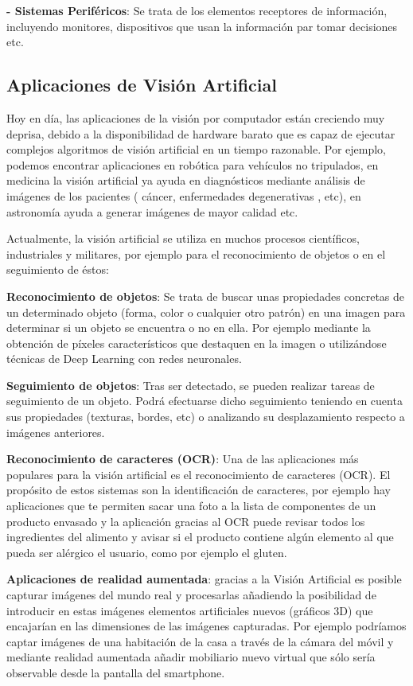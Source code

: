 	\textbf{- Sistemas Periféricos}: Se trata de los elementos receptores de información, incluyendo monitores, dispositivos que usan la información par tomar decisiones etc.

\subsection{Aplicaciones de Visión Artificial}
Hoy en día, las aplicaciones de la visión por computador están creciendo muy deprisa, debido a la disponibilidad de hardware barato que es capaz de ejecutar complejos algoritmos de visión artificial en un tiempo razonable. Por ejemplo, podemos encontrar aplicaciones en robótica para vehículos no tripulados, en medicina la visión artificial ya ayuda en diagnósticos mediante análisis de imágenes de los pacientes ( cáncer, enfermedades degenerativas , etc), en astronomía ayuda a generar imágenes de mayor calidad etc.

Actualmente, la visión artificial se utiliza en muchos procesos científicos, industriales y militares, por ejemplo para el reconocimiento de objetos o en el seguimiento de éstos:

	\textbf{Reconocimiento de objetos}: Se trata de buscar unas propiedades concretas de un determinado objeto (forma, color o cualquier otro patrón) en una imagen para determinar si un objeto se encuentra o no en ella. Por ejemplo mediante la obtención de píxeles característicos que destaquen en la imagen o utilizándose técnicas de Deep Learning con redes neuronales.

	\textbf{Seguimiento de objetos}: Tras ser detectado, se pueden realizar tareas de seguimiento de un objeto. Podrá efectuarse dicho seguimiento teniendo en cuenta sus propiedades (texturas, bordes, etc) o analizando su desplazamiento respecto a imágenes anteriores.

	\textbf{Reconocimiento de caracteres (OCR)}:  Una de las aplicaciones más populares para la visión artificial es el reconocimiento de caracteres (OCR). El propósito de estos sistemas son la identificación de caracteres, por ejemplo hay aplicaciones que te permiten sacar una foto a la lista de componentes de un producto envasado y la aplicación gracias al OCR puede revisar todos los ingredientes del alimento y avisar si el producto contiene algún elemento al que pueda ser alérgico el usuario, como por ejemplo el gluten.

	\textbf{Aplicaciones de realidad aumentada}: gracias a la Visión Artificial es posible capturar imágenes del mundo real y procesarlas añadiendo la posibilidad de introducir en estas imágenes elementos artificiales nuevos (gráficos 3D) que encajarían en las dimensiones de las imágenes capturadas. Por ejemplo podríamos captar imágenes de una habitación de la casa a través de la cámara del móvil y mediante realidad aumentada añadir mobiliario nuevo virtual que sólo sería observable desde la pantalla del smartphone.

